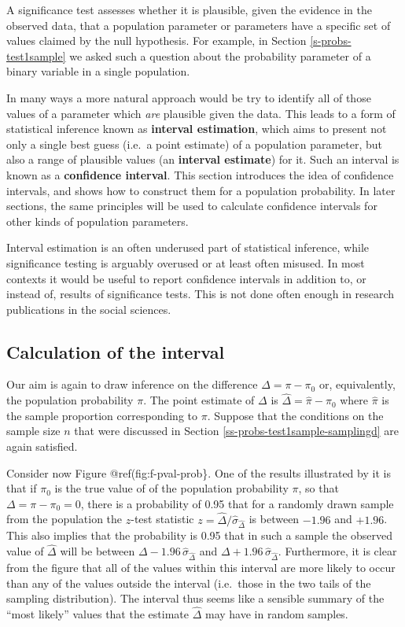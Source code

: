 \documentclass[11pt,a4paper,openany]{book}
\begin{document}
A significance test assesses whether it is plausible, given the evidence
in the observed data, that a population parameter or parameters have a
specific set of values claimed by the null hypothesis. For example, in
Section \ref{s-probs-test1sample} we asked such a question about the
probability parameter of a binary variable in a single population.

In many ways a more natural approach would be try to identify all of
those values of a parameter which \emph{are} plausible given the data.
This leads to a form of statistical inference known as \textbf{interval
estimation}, which aims to present not only a single best guess (i.e.~a
point estimate) of a population parameter, but also a range of plausible
values (an \textbf{interval estimate}) for it. Such an interval is known
as a \textbf{confidence interval}. This section introduces the idea of
confidence intervals, and shows how to construct them for a population
probability. In later sections, the same principles will be used to
calculate confidence intervals for other kinds of population parameters.

Interval estimation is an often underused part of statistical inference,
while significance testing is arguably overused or at least often
misused. In most contexts it would be useful to report confidence
intervals in addition to, or instead of, results of significance tests.
This is not done often enough in research publications in the social
sciences.

\subsection{Calculation of the interval}\label{s-probs-1sampleci-calc}

Our aim is again to draw inference on the difference
\(\Delta=\pi-\pi_{0}\) or, equivalently, the population probability
\(\pi\). The point estimate of \(\Delta\) is
\(\hat{\Delta}=\hat{\pi}-\pi_{0}\) where \(\hat{\pi}\) is the sample
proportion corresponding to \(\pi\). Suppose that the conditions on the
sample size \(n\) that were discussed in Section
\ref{ss-probs-test1sample-samplingd} are again satisfied.

Consider now Figure @ref(fig:f-pval-prob\}. One of the results
illustrated by it is that if \(\pi_{0}\) is the true value of of the
population probability \(\pi\), so that \(\Delta=\pi-\pi_{0}=0\), there
is a probability of 0.95 that for a randomly drawn sample from the
population the \(z\)-test statistic
\(z=\hat{\Delta}/\hat{\sigma}_{\hat{\Delta}}\) is between \(-1.96\) and
\(+1.96\). This also implies that the probability is 0.95 that in such a
sample the observed value of \(\hat{\Delta}\) will be between
\(\Delta-1.96\,\hat{\sigma}_{\hat{\Delta}}\) and
\(\Delta+1.96\,\hat{\sigma}_{\hat{\Delta}}\). Furthermore, it is clear
from the figure that all of the values within this interval are more
likely to occur than any of the values outside the interval (i.e.~those
in the two tails of the sampling distribution). The interval thus seems
like a sensible summary of the ``most likely'' values that the estimate
\(\hat{\Delta}\) may have in random samples.
\end{document}
